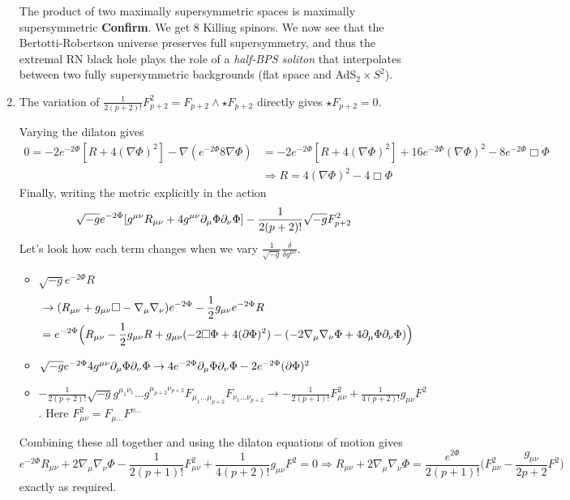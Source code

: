 \documentclass[11pt, class=article, crop=false]{standalone}
\begin{document}
\begin{enumerate}
	The product of two maximally supersymmetric spaces is maximally supersymmetric \textbf{Confirm}. We get $8$ Killing spinors. 
	We now see that the Bertotti-Robertson universe preserves full supersymmetry, and thus the extremal RN black hole plays the role of a \emph{half-BPS soliton} that interpolates between two fully supersymmetric backgrounds (flat space and AdS$_{2} \times S^2$). 
	
	
	
	
	\item The variation of $\frac{1}{2(p+2)!} F_{p+2}^2 = F_{p+2} \wedge \star F_{p+2}$ directly gives $\star F_{p+2} = 0$. 
	
	Varying the dilaton gives 
	\[
	\begin{aligned}
		0 = -2 e^{-2 \Phi} [R + 4 (\nabla \Phi)^2] - \nabla (e^{-2 \Phi} 8 \nabla \Phi) &= -2 e^{-2 \Phi} [R + 4 (\nabla \Phi)^2] + 16 e^{-2 \Phi} (\nabla \Phi)^2 - 8 e^{-2 \Phi} \Box \Phi\\
		&\Rightarrow R = 4 (\nabla \Phi)^2 - 4 \Box \Phi
	\end{aligned}	
	\]
	Finally, writing the metric explicitly in the action
	\[
		\sqrt{-g} e^{-2\Phi} [g^{\mu \nu} R_{\mu \nu} + 4 g^{\mu \nu} \partial_\mu \Phi \partial_\nu \Phi] - \frac{1}{2(p+2)!} \sqrt{-g} F^2_{p+2}
	\]
	Let's look how each term changes when we vary $\frac{1}{\sqrt{-g}} \frac{\delta}{\delta g^{\mu \nu}}$.
	\begin{itemize}
		\item $\sqrt{-g} e^{-2\Phi} R$
		 \[
		 \begin{aligned}
		 &\to (R_{\mu \nu} + g_{\mu \nu} \Box - \nabla_\mu \nabla_\nu) e^{-2\Phi}  - \frac12 g_{\mu \nu} e^{-2\Phi} R\\
		 &= e^{-2\Phi} \Big(R_{\mu \nu} - \frac12 g_{\mu \nu} R + g_{\mu \nu} (-2 \Box \Phi + 4 (\partial \Phi)^2) - (-2 \nabla_\mu \nabla_\nu \Phi + 4 \partial_\mu \Phi \partial_\nu \Phi) \Big) 
		 \end{aligned}
		\]
		\item $\sqrt{-g} e^{-2\Phi} 4 g^{\mu \nu} \partial_\mu \Phi \partial_\nu \Phi \to 4 e^{-2\Phi} \partial_\mu \Phi \partial_\nu \Phi - 2 e^{- 2 \Phi} (\partial \Phi)^2$
		\item $- \frac{1}{2(p+2)!} \sqrt{-g} g^{\mu_1 \nu_1} \dots g^{\mu_{p+2} \nu_{p+2}} F_{\mu_1 \dots \mu_{p+2}} F_{\nu_1 \dots \nu_{p+2}} \to - \frac{1}{2 (p+1)!} F_{\mu \nu}^2 + \frac{1}{4(p+2)!} g_{\mu \nu} F^2$. Here $F_{\mu \nu}^2 = F_{\mu \dots} F^{\nu \dots}$
	\end{itemize}
	Combining these all together and using the dilaton equations of motion gives
	\[
		e^{-2\Phi} R_{\mu \nu} + 2 \nabla_\mu \nabla_\nu \Phi - \frac{1}{2 (p+1)!} F_{\mu \nu}^2 + \frac{1}{4(p+2)!} g_{\mu \nu} F^2 = 0 \Rightarrow R_{\mu \nu} + 2 \nabla_\mu \nabla_\nu \Phi = \frac{e^{2\Phi}}{2(p+1)!} \Big(F_{\mu \nu}^2 - \frac{g_{\mu \nu}}{2 p+2} F^2\Big)
	\]
	exactly as required. 
	

\end{enumerate}
\end{document}
